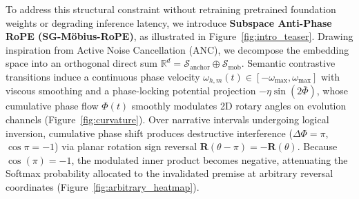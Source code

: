\documentclass[11pt,a4paper]{article}
\theoremstyle{definition}
\begin{document}
To address this structural constraint without retraining pretrained foundation weights or degrading inference latency, we introduce \textbf{Subspace Anti-Phase RoPE (SG-M\"obius-RoPE)}, as illustrated in Figure~\ref{fig:intro_teaser}. Drawing inspiration from Active Noise Cancellation (ANC), we decompose the embedding space into an orthogonal direct sum $\mathbb{R}^d = \mathcal{S}_{\text{anchor}} \oplus \mathcal{S}_{\text{mob}}$. Semantic contrastive transitions induce a continuous phase velocity $\omega_{h,m}(t) \in [-\omega_{\max}, \omega_{\max}]$ with viscous smoothing and a phase-locking potential projection $-\eta\sin(2\bar{\Phi})$, whose cumulative phase flow $\Phi(t)$ smoothly modulates 2D rotary angles on evolution channels (Figure~\ref{fig:curvature}). Over narrative intervals undergoing logical inversion, cumulative phase shift produces destructive interference ($\Delta \Phi = \pi$, $\cos\pi = -1$) via planar rotation sign reversal $\mathbf{R}(\theta - \pi) = -\mathbf{R}(\theta)$. Because $\cos(\pi) = -1$, the modulated inner product becomes negative, attenuating the Softmax probability allocated to the invalidated premise at arbitrary reversal coordinates (Figure~\ref{fig:arbitrary_heatmap}).
\end{document}
